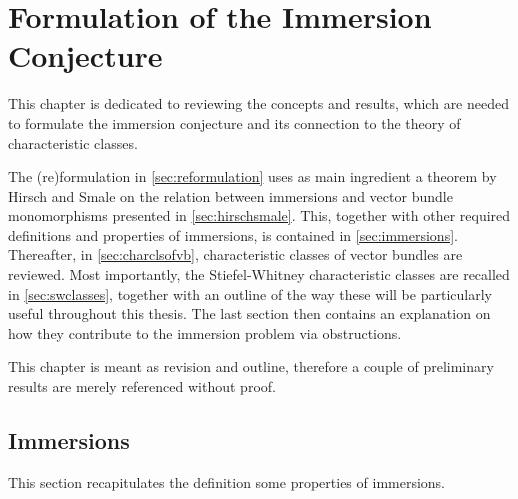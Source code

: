% 

\chapter{Formulation of the Immersion Conjecture}
\label{chap:reformulation}
This chapter is dedicated to reviewing the concepts and results,
which are needed to formulate the immersion conjecture and its
connection to the theory of characteristic classes.

The (re)formulation in \autoref{sec:reformulation} uses as main
ingredient a theorem by Hirsch and Smale on the relation between
immersions and vector bundle monomorphisms presented in
\autoref{sec:hirschsmale}.
This, together with other required definitions and properties of
immersions, is contained in \autoref{sec:immersions}.
Thereafter, in \autoref{sec:charclsofvb}, characteristic classes of vector
bundles are reviewed. Most importantly, the Stiefel-Whitney
characteristic classes are recalled in \autoref{sec:swclasses},
together with an outline of the way these will be particularly
useful throughout this thesis.
The last section then contains an explanation on how they contribute
to the immersion problem via obstructions.

This chapter is meant as revision and outline, therefore a
couple of preliminary results are merely referenced without proof.

\section{Immersions}\label{sec:immersions}
This section recapitulates the definition some properties
of immersions.

